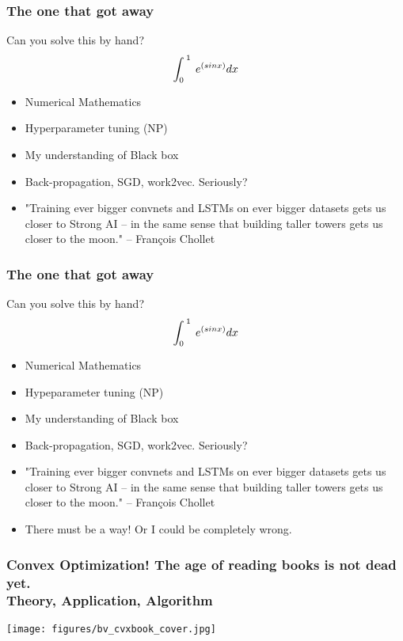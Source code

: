 \documentclass[10pt,mathserif]{beamer}
\begin{document}
\begin{frame}\frametitle{The one that got away}
	\begin{block}{Can you solve this by hand?}
		\[\Huge \int _{0\:}^{\:1}\:e^{\left(sinx\right)}dx\]
	\end{block}
	\begin{itemize}
		\item Numerical Mathematics 
		\item Hyperparameter tuning (NP)
		\item My understanding of Black box
		\item Back-propagation, SGD, work2vec. Seriously? 
		\item "Training ever bigger convnets and LSTMs on ever bigger datasets gets us closer to Strong AI -- in the same sense that building taller towers gets us closer to the moon." -- François Chollet

		
	\end{itemize}
	
\end{frame}

\begin{frame}\frametitle{The one that got away}
	\begin{block}{Can you solve this by hand?}
		\[\Huge \int _{0\:}^{\:1}\:e^{\left(sinx\right)}dx\]
	\end{block}
	\begin{itemize}
		\item Numerical Mathematics 
		\item Hypeparameter tuning (NP)
		\item My understanding of Black box
		\item Back-propagation, SGD, work2vec. Seriously? 
		\item "Training ever bigger convnets and LSTMs on ever bigger datasets gets us closer to Strong AI -- in the same sense that building taller towers gets us closer to the moon." -- François Chollet
		\item There must be a way! Or I could be completely wrong. 
		
	\end{itemize}
	
\end{frame}

\begin{frame}\frametitle{Convex Optimization! The age of reading books is not dead yet. \\
{Theory, Application, Algorithm}}
\begin{center}
\texttt{[image: figures/bv\_cvxbook\_cover.jpg]}
\end{center}
\end{frame}
\end{document}
